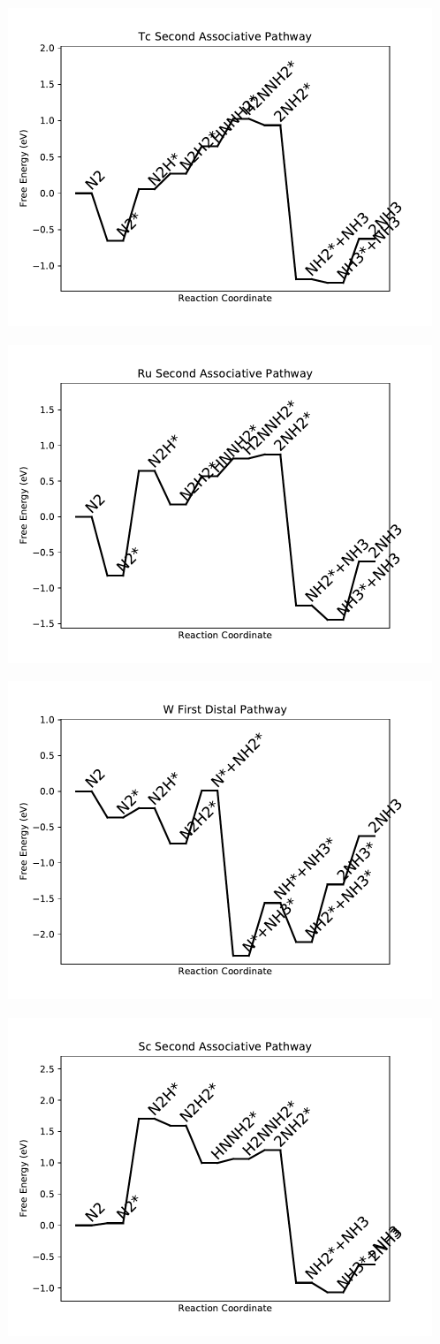 \documentclass[journal=jacsat,manuscript=article]{achemso}
\begin{document}
\begin{figure}
\includegraphics[width=0.5\linewidth]{data/plots/Tc_associative_2.pdf}
\label{fig:Tc_associative_2}
\end{figure}

\newpage
\begin{figure}
\includegraphics[width=0.5\linewidth]{data/plots/Ru_associative_2.pdf}
\label{fig:Ru_associative_2}
\end{figure}

\begin{figure}
\includegraphics[width=0.5\linewidth]{data/plots/W_distal_1.pdf}
\label{fig:W_distal_1}
\end{figure}

\newpage
\begin{figure}
\includegraphics[width=0.5\linewidth]{data/plots/Sc_associative_2.pdf}
\label{fig:Sc_associative_2}
\end{figure}
\end{document}
